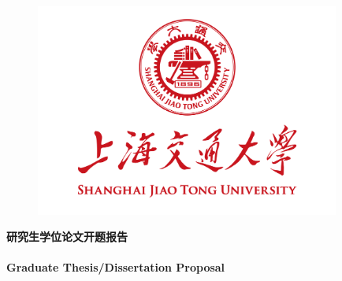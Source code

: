\documentclass[a4paper,zihao=-4,AutoFakeBold]{ctexart}
\begin{document}
\pagestyle{empty}

\begin{figure}[h]
    \centering
    \includegraphics[width=10cm]{figures/sjtu-logo.png}
\end{figure}

\begin{center}
    \vspace{-0.5cm}
    {\songti\bfseries 研究生学位论文开题报告}\\~\\
    {\bfseries Graduate Thesis/Dissertation Proposal}
    \vspace{0.5cm}
\end{center}
\end{document}
